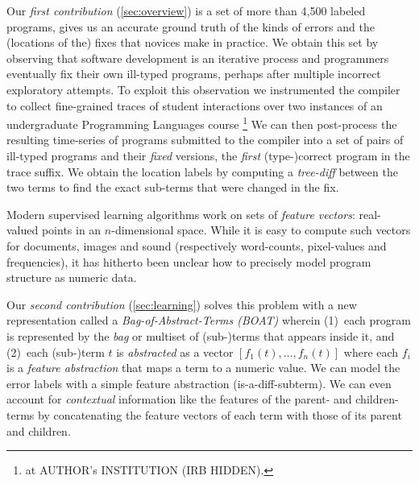 Our \emph{first contribution} (\autoref{sec:overview})
is a set of more than 4,500 labeled programs,
gives us an accurate ground truth of
the kinds of errors and the (locations
of the) fixes that novices make in
practice.
%
We obtain this set by observing that
software development is an iterative
process and programmers eventually
fix their own ill-typed programs,
perhaps after multiple incorrect
exploratory attempts.
%
To exploit this observation we instrumented
the \ocaml compiler to collect fine-grained
traces of student interactions over two instances
of an undergraduate Programming Languages course
%
\footnote{
at AUTHOR's INSTITUTION (IRB HIDDEN).
}
%
We can then post-process the resulting time-series
of programs submitted to the \ocaml compiler into
a set of pairs of ill-typed programs and their
\emph{fixed} versions, the \emph{first} (type-)correct
program in the trace suffix.
%
We obtain the location labels by computing a
\emph{tree-diff} between the two terms to find
the exact sub-terms that were changed in the fix.

%
Modern supervised learning algorithms work on sets of
\emph{feature vectors}: real-valued points in an
$n$-dimensional space. While it is easy to compute such
vectors for documents, images and sound (respectively
word-counts, pixel-values and frequencies), it has
hitherto been unclear how to precisely model program
structure as numeric data.

Our \emph{second contribution} (\autoref{sec:learning})
solves this problem with a new representation called
a \emph{Bag-of-Abstract-Terms (BOAT)} wherein
%
(1)~each program is represented by the \emph{bag}
    or multiset of (sub-)terms that appears inside
    it, and
%
(2)~each (sub-)term $t$ is \emph{abstracted} as
    a vector $[f_1(t), \ldots, f_n(t)]$ where
    each $f_i$ is a \emph{feature abstraction}
    that maps a term to a numeric value.
%
We can model the error labels with a simple feature
abstraction (\eg is-a-diff-subterm).
%
We can even account for \emph{contextual} information like
the features of the parent- and children- terms by
concatenating the feature vectors of each term with those
of its parent and children.

